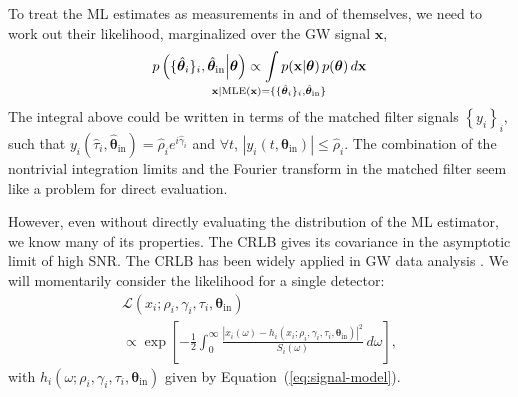 \documentclass[amsmath,amssymb,aps,prx,reprint,nopreprintnumbers,nofootinbib]{revtex4-1}
\def\clap#1{\hbox to 0pt{\hss#1\hss}}
\def\mathclap{\mathpalette\mathclapinternal}
\def\mathclapinternal#1#2{\clap{$\mathsurround=0pt#1{#2}$}}
\begin{document}
To treat the ML estimates as measurements in and of themselves, we need to work out their likelihood, marginalized over the GW signal $\mathbf{x}$,
%
\begin{equation}\label{eq:detection-candidate-likelihood}
    p\left(\{\hat{\bm\theta}_i\}_i,
        \hat{\bm\theta}_\mathrm{in}
    \middle| \bm\theta\right)
    \propto \int\limits_{\mathclap{\mathbf{x} | \mathrm{MLE}(\mathbf{x}) =
        \{\{\hat{\bm\theta}_i\}_i,
        \hat{\bm\theta}_\mathrm{in}\}}}
    p(\mathbf{x} | \bm\theta) \, p(\bm\theta)
    \, d\mathbf{x}
\end{equation}
%
The integral above could be written in terms of the matched filter signals $\left\{y_i\right\}_i$, such that $y_i\left(\hat\tau_i, \hat{\bm\theta}_\mathrm{in}\right) = \hat\rho_i e^{i \hat\gamma_i}$ and $\forall t$, $\left|y_i(t, \bm\theta_\mathrm{in})\right| \leq \hat\rho_i$. The combination of the nontrivial integration limits and the Fourier transform in the matched filter seem like a problem for direct evaluation.

However, even without directly evaluating the distribution of the \ac{ML} estimator, we know many of its properties. The \ac{CRLB} gives its covariance in the asymptotic limit of high \ac{SNR}. The \ac{CRLB} has been widely applied in \ac{GW} data analysis \cite{fairhurst:2009}. We will momentarily consider the likelihood for a single detector:
%
\begin{multline}\label{eq:gaussian-likelihood-spa}
    \mathcal{L}\left(x_i; \rho_i, \gamma_i, \tau_i,
        \bm\theta_\mathrm{in}\right) \\
    \propto \exp \left[
        - \frac{1}{2} \int_0^\infty \frac{\left|x_i (\omega)
            - h_i\left(x_i; \rho_i, \gamma_i, \tau_i,
                \bm\theta_\mathrm{in}\right)
        \right|^2}{S_i(\omega)} \, d\omega
    \right],
\end{multline}
%
with $h_i(\omega; \rho_i, \gamma_i, \tau_i, \bm\theta_\mathrm{in})$ given by Equation~(\ref{eq:signal-model}).
\end{document}
